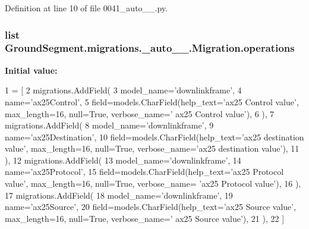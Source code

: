Definition at line 10 of file 0041\+\_\+auto\+\_\+\_.\+py.

\hypertarget{class_ground_segment_1_1migrations_1_10041__auto__20170131__2030_1_1_migration_a31947d154d17d75a49000bba8c36d774}{}
\subsubsection[{operations}]{\setlength{\rightskip}{0pt plus 5cm}list Ground\+Segment.\+migrations.\+\_\+auto\+\_\+\_.\+Migration.\+operations\hspace{0.3cm}{\ttfamily [static]}}\label{class_ground_segment_1_1migrations_1_10041__auto__20170131__2030_1_1_migration_a31947d154d17d75a49000bba8c36d774}
{\bfseries Initial value\+:}
\begin{DoxyCode}
1 = [
2         migrations.AddField(
3             model\_name=\textcolor{stringliteral}{'downlinkframe'},
4             name=\textcolor{stringliteral}{'ax25Control'},
5             field=models.CharField(help\_text=\textcolor{stringliteral}{'ax25 Control value'}, max\_length=16, null=\textcolor{keyword}{True}, verbose\_name=\textcolor{stringliteral}{'
      ax25 Control value'}),
6         ),
7         migrations.AddField(
8             model\_name=\textcolor{stringliteral}{'downlinkframe'},
9             name=\textcolor{stringliteral}{'ax25Destination'},
10             field=models.CharField(help\_text=\textcolor{stringliteral}{'ax25 destination value'}, max\_length=16, null=\textcolor{keyword}{True}, 
      verbose\_name=\textcolor{stringliteral}{'ax25 destination value'}),
11         ),
12         migrations.AddField(
13             model\_name=\textcolor{stringliteral}{'downlinkframe'},
14             name=\textcolor{stringliteral}{'ax25Protocol'},
15             field=models.CharField(help\_text=\textcolor{stringliteral}{'ax25 Protocol value'}, max\_length=16, null=\textcolor{keyword}{True}, verbose\_name=\textcolor{stringliteral}{
      'ax25 Protocol value'}),
16         ),
17         migrations.AddField(
18             model\_name=\textcolor{stringliteral}{'downlinkframe'},
19             name=\textcolor{stringliteral}{'ax25Source'},
20             field=models.CharField(help\_text=\textcolor{stringliteral}{'ax25 Source value'}, max\_length=16, null=\textcolor{keyword}{True}, verbose\_name=\textcolor{stringliteral}{'
      ax25 Source value'}),
21         ),
22     ]
\end{DoxyCode}


